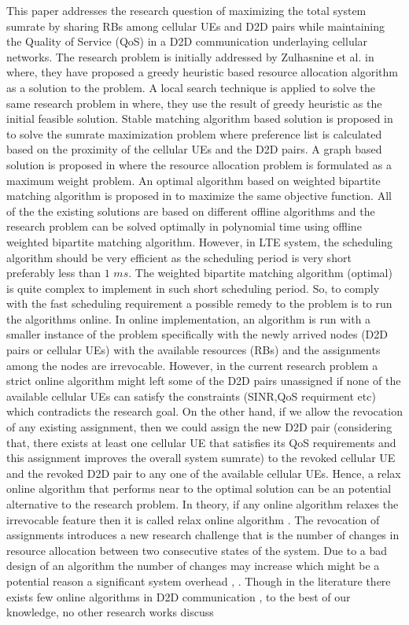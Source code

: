 \documentclass[times]{dacauth}
\begin{document}
\smallskip
\noindent 
This paper addresses the research question of maximizing the total system sumrate by sharing RBs among cellular UEs and D2D  pairs while maintaining the Quality of Service (QoS) in a D2D communication underlaying cellular networks. The research problem is initially addressed by Zulhasnine et al. in \cite{zulhasnine} where, they have proposed a greedy heuristic based resource allocation algorithm as a solution to the problem. A local search technique is applied to solve the same research problem in \cite{lora} where, they use the result of greedy heuristic \cite{zulhasnine} as the initial feasible solution. Stable matching algorithm \cite{kleinberg2011algorithm} based solution is proposed in \cite{dara} to solve the sumrate maximization problem where preference list is calculated based on the proximity of the cellular UEs and the D2D pairs. A graph based solution is proposed in \cite{zhang} where the resource allocation problem is formulated as a maximum weight problem. An optimal algorithm based on weighted bipartite matching algorithm is proposed in \cite{ccnc} to maximize the same objective function. All of the the existing solutions are based on different offline algorithms and the research problem can be solved optimally in polynomial time using offline weighted bipartite matching algorithm. However, in LTE system, the scheduling algorithm should be very efficient as the scheduling period is very short preferably less than $1$  $ms$. The weighted bipartite matching algorithm (optimal) is quite complex to implement in such short scheduling period. So, to comply with the fast scheduling requirement a possible remedy to the problem is to run the algorithms online. In online implementation, an algorithm is run with a smaller instance of the problem specifically with the newly arrived nodes (D2D pairs or cellular UEs) with the available resources (RBs) and  the assignments among the nodes are irrevocable. However, in the current research problem a strict online algorithm  might left some of the D2D pairs unassigned if none of the available cellular UEs can satisfy the constraints (SINR,QoS requirment etc) which contradicts the research goal. On the other hand, if we allow the revocation of any existing assignment, then we could assign the new D2D pair (considering that, there exists at least one cellular UE that satisfies its QoS requirements and this assignment improves the overall system sumrate) to the revoked cellular UE and the revoked D2D pair to any one of the available cellular UEs. Hence, a relax online algorithm that performs near to the optimal solution can be an potential alternative to the research problem. In theory, if any online algorithm relaxes the irrevocable feature then it is called relax online algorithm \cite {relax}. The revocation of assignments introduces a new research challenge that is the number of changes in resource allocation between two consecutive states of the system. Due to a bad design of an algorithm the number of changes may increase which might be a potential reason a significant system overhead \cite{asadi2014survey}, \cite{seidel20133gpp}. Though in the literature there exists few online algorithms in D2D communication \cite{onlined2d, xu2014dynamic}, to the best of our knowledge, no other research works discuss 
\end{document}
